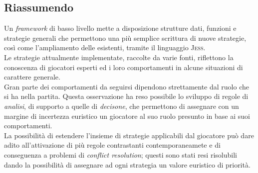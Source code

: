 \subsection{Riassumendo}

Un \emph{framework} di basso livello mette a disposizione strutture dati, funzioni e strategie generali che permettono una più semplice scrittura di nuove strategie, così come l'ampliamento delle esistenti, tramite il linguaggio \textsc{Jess}.\\
Le strategie attualmente implementate, raccolte da varie fonti, riflettono la conoscenza di giocatori esperti ed i loro comportamenti in alcune situazioni di carattere generale.\\
Gran parte dei comportamenti da seguirsi dipendono strettamente dal ruolo che si ha nella partita. Questa osservazione ha reso possibile lo sviluppo di regole di \emph{analisi}, di supporto a quelle di \emph{decisone}, che permettono di assegnare con un margine di incertezza euristico un giocatore al suo ruolo presunto in base ai suoi comportamenti.\\
La possibilità di estendere l'insieme di strategie applicabili dal giocatore può dare adito all'attivazione di più regole contrastanti contemporaneamete e di conseguenza a problemi di \emph{conflict resolution}; questi sono stati resi risolubili dando la possibilità di assegnare ad ogni strategia un valore euristico di priorità.

